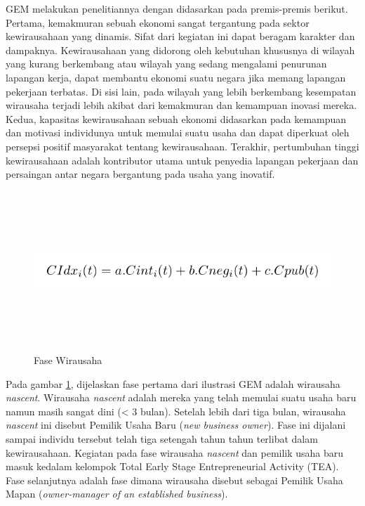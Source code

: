 GEM melakukan penelitiannya dengan didasarkan pada premis-premis berikut. Pertama, kemakmuran sebuah ekonomi sangat tergantung pada sektor kewirausahaan yang dinamis. Sifat dari kegiatan ini dapat beragam karakter dan dampaknya. Kewirausahaan yang didorong oleh kebutuhan khususnya di wilayah yang kurang berkembang atau wilayah yang sedang mengalami penurunan lapangan kerja, dapat membantu ekonomi suatu negara jika memang lapangan pekerjaan terbatas. Di sisi lain, pada wilayah yang lebih berkembang kesempatan wirausaha terjadi lebih akibat dari kemakmuran dan kemampuan inovasi mereka. Kedua, kapasitas kewirausahaan sebuah ekonomi didasarkan pada kemampuan dan motivasi individunya untuk memulai suatu usaha dan dapat diperkuat oleh persepsi positif masyarakat tentang kewirausahaan. Terakhir, pertumbuhan tinggi kewirausahaan adalah kontributor utama untuk penyedia lapangan pekerjaan dan persaingan antar negara bergantung pada usaha yang inovatif.
\begin{figure} 
	\centering  
	\includegraphics[width=14cm, height=6cm]{Capture}  
	\caption[Fase Wirausaha]{Fase Wirausaha} 
	\label{fig:artiwirausaha} 
\end{figure}

Pada gambar \ref{fig:artiwirausaha}, dijelaskan fase pertama dari ilustrasi GEM adalah wirausaha \textit{nascent}. Wirausaha \textit{nascent} adalah mereka yang telah memulai suatu usaha baru namun masih sangat dini (< 3 bulan). Setelah lebih dari tiga bulan, wirausaha \textit{nascent} ini disebut Pemilik Usaha Baru (\textit{new business owner}). Fase ini dijalani sampai individu tersebut telah tiga setengah tahun tahun terlibat dalam kewirausahaan. Kegiatan pada fase wirausaha \textit{nascent} dan pemilik usaha baru masuk kedalam kelompok Total Early Stage Entrepreneurial Activity (TEA). Fase selanjutnya adalah fase dimana wirausaha disebut sebagai Pemilik Usaha Mapan (\textit{owner-manager of an established business}). 

